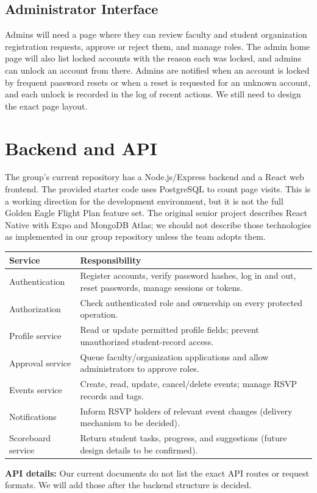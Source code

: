 \subsection{Administrator Interface}
Admins will need a page where they can review faculty and student organization registration requests, approve or reject them, and manage roles. The admin home page will also list locked accounts with the reason each was locked, and admins can unlock an account from there. Admins are notified when an account is locked by frequent password resets or when a reset is requested for an unknown account, and each unlock is recorded in the log of recent actions. We still need to design the exact page layout.

\newpage %
\section{Backend and API}
The group's current repository has a Node.js/Express backend and a React web frontend. The provided starter code uses PostgreSQL to count page visits. This is a working direction for the development environment, but it is not the full Golden Eagle Flight Plan feature set. The original senior project describes React Native with Expo and MongoDB Atlas; we should not describe those technologies as implemented in our group repository unless the team adopts them.
\begin{longtable}{L{0.30\textwidth}L{0.60\textwidth}}
\toprule Service & Responsibility \\ \midrule
Authentication & Register accounts, verify password hashes, log in and out, reset passwords, manage sessions or tokens.\\
Authorization & Check authenticated role and ownership on every protected operation.\\
Profile service & Read or update permitted profile fields; prevent unauthorized student-record access.\\
Approval service & Queue faculty/organization applications and allow administrators to approve roles.\\
Events service & Create, read, update, cancel/delete events; manage RSVP records and tags.\\
Notifications & Inform RSVP holders of relevant event changes (delivery mechanism to be decided).\\
Scoreboard service & Return student tasks, progress, and suggestions (future design details to be confirmed).\\
\bottomrule
\end{longtable}
\noindent\textbf{API details:} Our current documents do not list the exact API routes or request formats. We will add those after the backend structure is decided.

